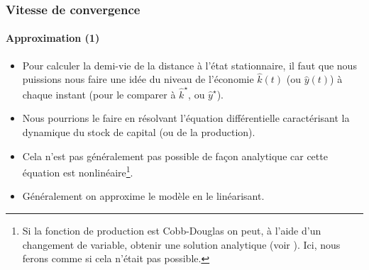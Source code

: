 \documentclass[10pt,notheorems]{beamer}
\theoremstyle{plain}
\theoremstyle{definition} %
\begin{document}
\begin{frame}
  \frametitle{Vitesse de convergence}
  \framesubtitle{Approximation (1)}

  \begin{itemize}

  \item Pour calculer la demi-vie de la distance à l'état stationnaire, il faut
    que nous puissions nous faire une idée du niveau de l'économie $\hat k(t)$ (ou
    $\hat y(t)$) à chaque instant (pour le comparer à $\hat k^\star$, ou
    $\hat y^{\star}$).\newline

  \item Nous pourrions le faire en résolvant l'équation différentielle
    caractérisant la dynamique du stock de capital (ou de la
    production).\newline

  \item Cela n'est pas généralement pas possible de façon analytique car cette
    équation est nonlinéaire\footnote[frame]{Si la fonction de production est
      Cobb-Douglas on peut, à l'aide d'un changement de variable, obtenir une solution analytique (voir
      \href{https://stephane-adjemian.fr/posts/simulation-du-modele-de-solow/}{}).
      Ici, nous ferons comme si cela n'était pas possible.}.\newline

  \item Généralement on approxime le modèle en le linéarisant.

  \end{itemize}

\end{frame}
\end{document}
